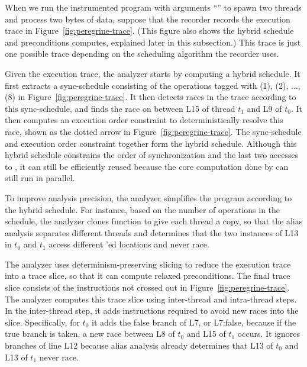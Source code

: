 When we run the instrumented program with arguments ``'' to spawn
two threads and process two bytes of data, suppose that the recorder records
the execution trace in Figure~\ref{fig:peregrine-trace}.  (This figure also shows
the hybrid schedule and preconditions \peregrine computes, explained
later in this subsection.)  This trace is just one
possible trace depending on the scheduling algorithm the recorder uses.

Given the execution trace, the analyzer starts by computing a hybrid
schedule.  It first extracts a sync-schedule consisting of the operations
tagged with (1), (2), ..., (8) in Figure~\ref{fig:peregrine-trace}.  It then detects races in
the trace according to this sync-schedule, and finds the race on
 between L15 of thread $t_1$ and L9 of $t_0$.  It then computes an
execution order constraint to deterministically resolve this race, shown
as the dotted arrow in Figure~\ref{fig:peregrine-trace}.  The sync-schedule and
execution order constraint together form the hybrid schedule.  Although
this hybrid schedule constrains the order of synchronization and the last
two accesses to , it can still be efficiently reused because the
core computation done by  can still run in parallel.


To improve analysis precision, the analyzer simplifies the program according to the
hybrid schedule.  For instance, based on the number of
 operations in the schedule, the analyzer
clones function  to give each thread a copy,
so that the alias analysis separates different threads and determines that
the two instances of L13 in $t_0$ and $t_1$ access different
'ed locations and never race.

The analyzer uses
determinism-preserving slicing to reduce the execution trace into a trace
slice, so that it can compute relaxed preconditions.
The final trace slice consists of the instructions not crossed out
in Figure~\ref{fig:peregrine-trace}.
The analyzer computes this trace slice using inter-thread and 
intra-thread steps.  In the inter-thread step, it adds instructions
required to avoid new races into the slice.  Specifically, for $t_0$ it adds
the false branch of L7, or L7:false, because if the true branch
is taken, a new race between L8 of $t_0$ and L15 of $t_1$ occurs.  It
ignores branches of line L12 because alias analysis already determines that L13 of
$t_0$ and L13 of $t_1$ never race.

